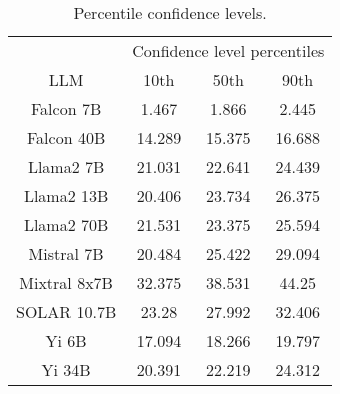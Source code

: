 \begin{table*}
\centering
\begin{tabular}{c|c|c|c}
& \multicolumn{3}{c}{Confidence level percentiles} \\ 
LLM & 10th & 50th & 90th\\ \hline
Falcon 7B & 1.467 & 1.866 & 2.445\\
Falcon 40B & 14.289 & 15.375 & 16.688\\
Llama2 7B & 21.031 & 22.641 & 24.439\\
Llama2 13B & 20.406 & 23.734 & 26.375\\
Llama2 70B & 21.531 & 23.375 & 25.594\\
Mistral 7B & 20.484 & 25.422 & 29.094\\
Mixtral 8x7B & 32.375 & 38.531 & 44.25\\
SOLAR 10.7B & 23.28 & 27.992 & 32.406\\
Yi 6B & 17.094 & 18.266 & 19.797\\
Yi 34B & 20.391 & 22.219 & 24.312\\
\hline
\end{tabular}
\caption{Percentile confidence levels.}
\label{tab:percentile_conf}
\end{table*}
